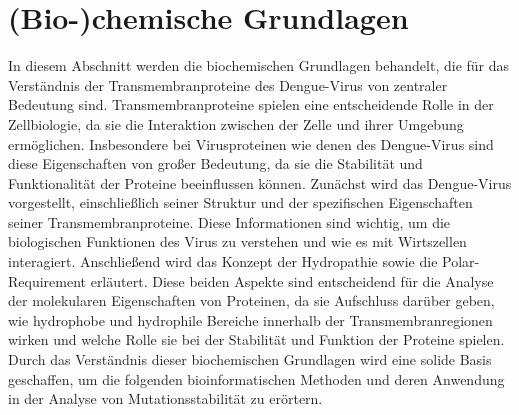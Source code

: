 \documentclass[german,version-2022-01]{uzl-thesis}
\begin{document}
\section{(Bio-)chemische Grundlagen}
In diesem Abschnitt werden die biochemischen Grundlagen behandelt, die f\"ur das Verst\"andnis der Transmembranproteine des Dengue-Virus von zentraler Bedeutung sind. Transmembranproteine spielen eine entscheidende Rolle in der Zellbiologie, da sie die Interaktion zwischen der Zelle und ihrer Umgebung erm\"oglichen. Insbesondere bei Virusproteinen wie denen des Dengue-Virus sind diese Eigenschaften von gro\ss{}er Bedeutung, da sie die Stabilit\"at und Funktionalit\"at der Proteine beeinflussen k\"onnen. Zun\"achst wird das Dengue-Virus vorgestellt, einschlie\ss{}lich seiner Struktur und der spezifischen Eigenschaften seiner Transmembranproteine. Diese Informationen sind wichtig, um die biologischen Funktionen des Virus zu verstehen und wie es mit Wirtszellen interagiert. Anschlie\ss{}end wird das Konzept der Hydropathie sowie die Polar-Requirement erl\"autert. Diese beiden Aspekte sind entscheidend f\"ur die Analyse der molekularen Eigenschaften von Proteinen, da sie Aufschluss dar\"uber geben, wie hydrophobe und hydrophile Bereiche innerhalb der Transmembranregionen wirken und welche Rolle sie bei der Stabilit\"at und Funktion der Proteine spielen. Durch das Verst\"andnis dieser biochemischen Grundlagen wird eine solide Basis geschaffen, um die folgenden bioinformatischen Methoden und deren Anwendung in der Analyse von Mutationsstabilit\"at zu er\"ortern.
\end{document}
